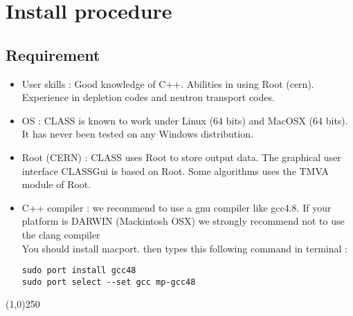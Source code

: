 \chapter{Install procedure}

\section{Requirement}

\begin{center}
\begin{minipage}{\textwidth}
\begin{itemize}
\item User skills : Good knowledge of C++. Abilities in using Root (cern). Experience in depletion codes and neutron transport codes.
\item OS : CLASS is known to work under Linux (64  bits) and MacOSX (64 bits). It  has never been tested on any Windows distribution.
\item Root (CERN) :  
CLASS uses Root to store output data. 
The graphical user interface CLASSGui is based on Root.
Some algorithms uses the TMVA module of Root.
 \item C++ compiler :  we recommend to use a gnu compiler like gcc4.8. 
If your platform is DARWIN (Mackintosh OSX) we strongly recommend not to use the clang compiler\\
You should install macport. then types this following command in terminal :\\
\begin{lstlisting}[style=terminal]
sudo port install gcc48
sudo port select --set gcc mp-gcc48
\end{lstlisting}
\end{itemize}
\end{minipage}
\end{center}

\begin{center}
\line(1,0){250}
\end{center}

